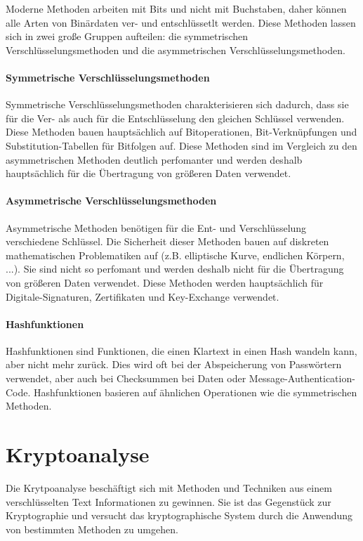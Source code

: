 \documentclass[12pt,a4paper]{report}
\begin{document}
Moderne Methoden arbeiten mit Bits und nicht mit Buchstaben, daher können alle Arten von Binärdaten ver- und entschlüssetlt werden. Diese Methoden lassen sich in zwei große Gruppen aufteilen: die symmetrischen Verschlüsselungsmethoden und die asymmetrischen Verschlüsselungsmethoden.

\paragraph{Symmetrische Verschlüsselungsmethoden} Symmetrische Verschlüsselungsmethoden charakterisieren sich dadurch, dass sie für die Ver- als auch für die Entschlüsselung den gleichen Schlüssel verwenden. Diese Methoden bauen hauptsächlich auf Bitoperationen, Bit-Verknüpfungen und Substitution-Tabellen für Bitfolgen auf. Diese Methoden sind im Vergleich zu den asymmetrischen Methoden deutlich perfomanter und werden deshalb hauptsächlich für die Übertragung von größeren Daten verwendet.

\paragraph{Asymmetrische Verschlüsselungsmethoden} Asymmetrische Methoden benötigen für die Ent- und Verschlüsselung verschiedene Schlüssel. Die Sicherheit dieser Methoden bauen auf diskreten mathematischen Problematiken auf (z.B. elliptische Kurve, endlichen Körpern, ...). Sie sind nicht so perfomant und werden deshalb nicht für die Übertragung von größeren Daten verwendet. Diese Methoden werden hauptsächlich für Digitale-Signaturen, Zertifikaten und Key-Exchange verwendet.

\paragraph{Hashfunktionen} Hashfunktionen sind Funktionen, die einen Klartext in einen Hash wandeln kann, aber nicht mehr zurück. Dies wird oft bei der Abspeicherung von Passwörtern verwendet, aber auch bei Checksummen bei Daten oder Message-Authentication-Code. Hashfunktionen basieren auf ähnlichen Operationen wie die symmetrischen Methoden.

\section{Kryptoanalyse}

Die Krytpoanalyse beschäftigt sich mit Methoden und Techniken aus einem verschlüsselten Text Informationen zu gewinnen. Sie ist das Gegenstück zur Kryptographie und versucht das kryptographische System durch die Anwendung von bestimmten Methoden zu umgehen.
\end{document}
